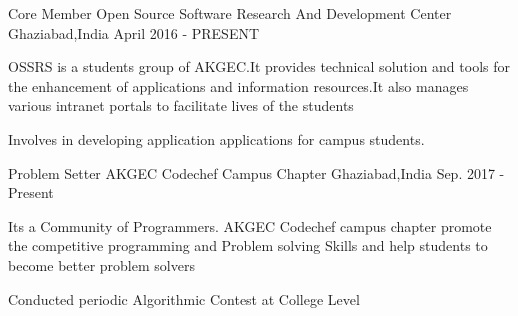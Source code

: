 

\begin{cventries}

  \cventry
    {Core Member} %
    {Open Source Software Research And Development Center} %
    {Ghaziabad,India} %
    {April 2016 - PRESENT} %
    {
      \begin{cvitems} %
        \item {OSSRS is a students group of AKGEC.It provides technical solution and tools for the enhancement of applications and information resources.It also manages various intranet portals to facilitate lives of the students }
        \item {Involves in developing application applications for campus students.}
      \end{cvitems}
    }

  \cventry
    {Problem Setter} %
    {AKGEC Codechef Campus Chapter} %
    {Ghaziabad,India} %
    {Sep. 2017 - Present} %
    {
      \begin{cvitems} %
        \item {Its a Community of Programmers. AKGEC Codechef campus chapter promote the competitive programming and Problem solving Skills and help students to become better problem solvers }
        \item {Conducted periodic Algorithmic Contest at College Level}
      \end{cvitems}
    }

\end{cventries}
